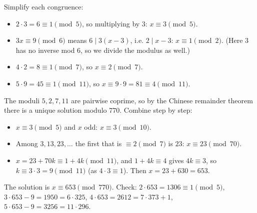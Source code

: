 Simplify each congruence:
\begin{itemize}
\item $2\cdot3=6\equiv1\pmod5$, so multiplying by $3$: $x\equiv3\pmod5$.
\item $3x\equiv9\pmod6$ means $6\mid3(x-3)$, i.e. $2\mid x-3$: $x\equiv1\pmod2$. (Here $3$ has no inverse mod $6$, so we divide the modulus as well.)
\item $4\cdot2=8\equiv1\pmod7$, so $x\equiv2\pmod7$.
\item $5\cdot9=45\equiv1\pmod{11}$, so $x\equiv9\cdot9=81\equiv4\pmod{11}$.
\end{itemize}
The moduli $5,2,7,11$ are pairwise coprime, so by the Chinese remainder theorem there is a unique solution modulo $770$. Combine step by step:
\begin{itemize}
\item $x\equiv3\pmod5$ and $x$ odd: $x\equiv3\pmod{10}$.
\item Among $3,13,23,\dots$ the first that is $\equiv2\pmod7$ is $23$: $x\equiv23\pmod{70}$.
\item $x=23+70k\equiv1+4k\pmod{11}$, and $1+4k\equiv4$ gives $4k\equiv3$, so $k\equiv3\cdot3=9\pmod{11}$ (as $4\cdot3\equiv1$). Then $x=23+630=653$.
\end{itemize}
The solution is $\boxed{x\equiv653\pmod{770}}$. Check: $2\cdot653=1306\equiv1\pmod5$, $3\cdot653-9=1950=6\cdot325$, $4\cdot653=2612=7\cdot373+1$, $5\cdot653-9=3256=11\cdot296$.
